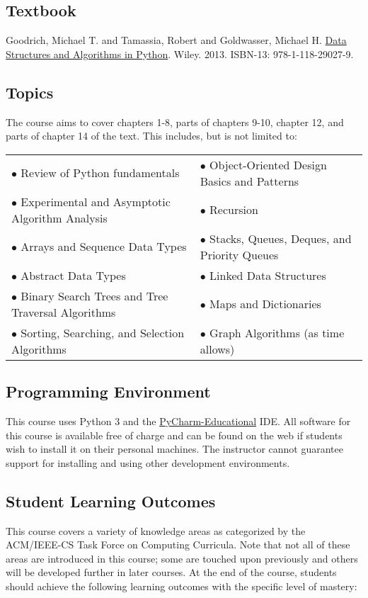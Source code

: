 \documentclass[10pt]{article}
\begin{document}
\subsection{Textbook}
\label{sec:orgc3d87e3}

\noindent
Goodrich, Michael T. and Tamassia, Robert and Goldwasser, Michael H. \underline{Data Structures and Algorithms in Python}. Wiley. 2013. ISBN-13: 978-1-118-29027-9.


\subsection{Topics}
\label{sec:org302b48c}
The course aims to cover chapters 1-8, parts of chapters 9-10,
chapter 12, and parts of chapter 14 of the text. This includes, but is
not limited to:

\begin{center}
\begin{tabular}{ll}
\(\bullet\) Review of Python fundamentals & \(\bullet\) Object-Oriented Design Basics and Patterns\\
\(\bullet\) Experimental and Asymptotic Algorithm Analysis & \(\bullet\) Recursion\\
\(\bullet\) Arrays and Sequence Data Types & \(\bullet\) Stacks, Queues, Deques, and Priority Queues\\
\(\bullet\) Abstract Data Types & \(\bullet\) Linked Data Structures\\
\(\bullet\) Binary Search Trees and Tree Traversal Algorithms & \(\bullet\) Maps and Dictionaries\\
\(\bullet\) Sorting, Searching, and Selection Algorithms & \(\bullet\) Graph Algorithms (as time allows)\\
\end{tabular}
\end{center}

\subsection{Programming Environment}
\label{sec:org16c7836}
This course uses Python 3 and the \href{https://www.jetbrains.com/education/download/#section=pycharm-edu}{PyCharm-Educational} IDE.  All software
for this course is available free of charge and can be found on the
web if students wish to install it on their personal
machines. The instructor cannot guarantee support for
installing and using other development environments.

\subsection{Student Learning Outcomes}
\label{sec:org99410f2}
This course covers a variety of knowledge areas as categorized by the
ACM/IEEE-CS Task Force on Computing Curricula. Note that not all of
these areas are introduced in this course; some are touched upon
previously and others will be developed further in later courses. At
the end of the course, students should achieve the following learning
outcomes with the specific level of mastery:
\end{document}
